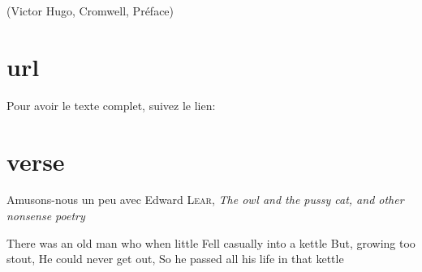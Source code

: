 \documentclass{book}
\begin{document}
(Victor Hugo, Cromwell, Préface)

\section{url}
Pour avoir le texte complet, suivez le lien: %

\section{verse}

Amusons-nous un peu avec Edward \textsc{Lear}, \emph{The owl and the pussy cat, and other nonsense poetry}

There was an old man who when little
Fell casually into a kettle
	But, growing too stout,
	He could never get out,
So he passed all his life in that kettle
\end{document}
